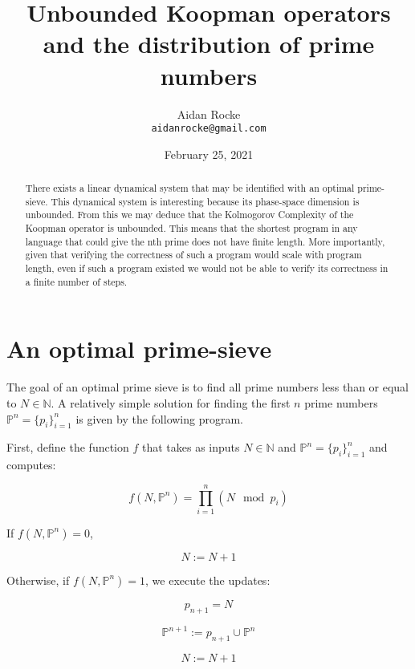 \documentclass{article}
\title{Unbounded Koopman operators and the distribution of prime numbers}
\date{February 25, 2021}
\author{%
  Aidan Rocke\\
  \texttt{aidanrocke@gmail.com} \\
}
\begin{document}
\maketitle

\begin{abstract}
There exists a linear dynamical system that may be identified with an optimal prime-sieve. This
dynamical system is interesting because its phase-space dimension is unbounded. From this we may deduce that the
Kolmogorov Complexity of the Koopman operator is unbounded. This means that the shortest program in any language
that could give the nth prime does not have finite length. More importantly, given that verifying the correctness of such a program would scale with program length, even if such a program existed we would not be able to verify its correctness in a finite number of steps.
	
\end{abstract}

\section{An optimal prime-sieve}

The goal of an optimal prime sieve is to find all prime numbers less than or equal to $N \in \mathbb{N}$.
A relatively simple solution for finding the first $n$ prime numbers $\mathbb{P}^n = \{p_i\}_{i=1}^n$
is given by the following program.

First, define the function $f$ that takes as inputs $N \in \mathbb{N}$ and $\mathbb{P}^n = \{p_i\}_{i=1}^n$
and computes:

\begin{equation}
f(N, \mathbb{P}^n) = \prod_{i=1}^n (N \mod p_i)
\end{equation}

If $f(N, \mathbb{P}^n) = 0$,

\begin{equation}
N:=N+1
\end{equation}

Otherwise, if $f(N, \mathbb{P}^n) = 1$, we execute the updates:

\begin{equation}
p_{n+1} = N
\end{equation}

\begin{equation}
\mathbb{P}^{n+1} := p_{n+1} \cup \mathbb{P}^n
\end{equation}

\begin{equation}
N := N+1
\end{equation}
\end{document}
